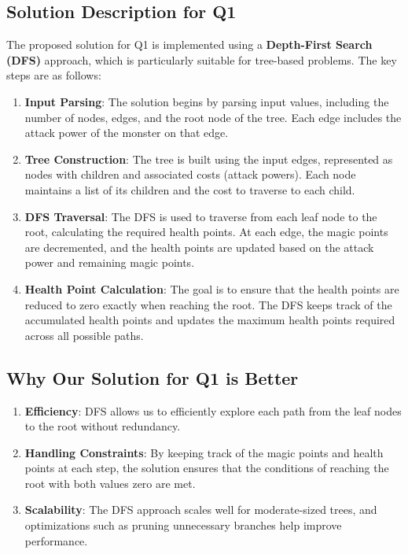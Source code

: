 \documentclass{article}
\begin{document}
\subsection{Solution Description for Q1}
The proposed solution for Q1 is implemented using a \textbf{Depth-First Search (DFS)} approach, which is particularly suitable for tree-based problems. The key steps are as follows:

\begin{enumerate}
    \item \textbf{Input Parsing}: The solution begins by parsing input values, including the number of nodes, edges, and the root node of the tree. Each edge includes the attack power of the monster on that edge.
    \item \textbf{Tree Construction}: The tree is built using the input edges, represented as nodes with children and associated costs (attack powers). Each node maintains a list of its children and the cost to traverse to each child.
    \item \textbf{DFS Traversal}: The DFS is used to traverse from each leaf node to the root, calculating the required health points. At each edge, the magic points are decremented, and the health points are updated based on the attack power and remaining magic points.
    \item \textbf{Health Point Calculation}: The goal is to ensure that the health points are reduced to zero exactly when reaching the root. The DFS keeps track of the accumulated health points and updates the maximum health points required across all possible paths.
\end{enumerate}

\subsection{Why Our Solution for Q1 is Better}
\begin{enumerate}
    \item \textbf{Efficiency}: DFS allows us to efficiently explore each path from the leaf nodes to the root without redundancy.
    \item \textbf{Handling Constraints}: By keeping track of the magic points and health points at each step, the solution ensures that the conditions of reaching the root with both values zero are met.
    \item \textbf{Scalability}: The DFS approach scales well for moderate-sized trees, and optimizations such as pruning unnecessary branches help improve performance.
\end{enumerate}
\end{document}
